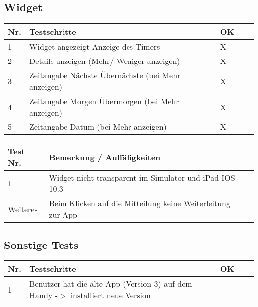 \subsection{Widget}
\noindent%
\begin{tabularx}{\textwidth}{|p{}|p{}|X|X|X| }
\hline
\textbf{Nr.} &\textbf{Testschritte} &\textbf{OK}   \\ \hline 
1 & Widget angezeigt Anzeige des Timers & X     \\ \hline
2 & Details anzeigen (Mehr/ Weniger anzeigen) & X    \\ \hline
3 & Zeitangabe Nächste Übernächste (bei Mehr anzeigen) & X   \\ \hline
4 & Zeitangabe Morgen Übermorgen (bei Mehr anzeigen) & X  \\ \hline
5 & Zeitangabe Datum (bei Mehr anzeigen) & X  \\ \hline
\end{tabularx}
\newline
\newline

\noindent%
\begin{tabularx}{\textwidth}{|p{}|X|X| }
\hline
\textbf{Test Nr.} &\textbf{Bemerkung / Auffäligkeiten}   \\ \hline 
 1 & 
Widget nicht transparent im Simulator und iPad IOS 10.3  \\ \hline
Weiteres & 
Beim Klicken auf die Mitteilung keine Weiterleitung zur App  \\ \hline
\end{tabularx}
\newline
\newline

\subsection{Sonstige Tests}

\noindent%
\begin{tabularx}{\textwidth}{|p{}|p{}|X|X|X| }
\hline
\textbf{Nr.} &\textbf{Testschritte} &\textbf{OK}   \\ \hline 

1 & Benutzer hat die alte App (Version 3) auf dem Handy -$>$ installiert neue Version &      \\ \hline

\end{tabularx}
\newline
